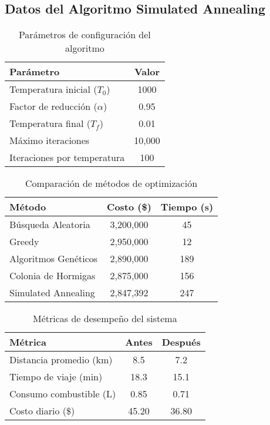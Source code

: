 \documentclass[12pt,a4paper,twocolumn]{article}
\begin{document}
\subsection{Datos del Algoritmo Simulated Annealing}

\begin{table}[h!]
\centering
\caption{Parámetros de configuración del algoritmo}
\begin{tabular}{@{}lc@{}}
\toprule
\textbf{Parámetro} & \textbf{Valor} \\
\midrule
Temperatura inicial ($T_0$) & 1000 \\
Factor de reducción ($\alpha$) & 0.95 \\
Temperatura final ($T_f$) & 0.01 \\
Máximo iteraciones & 10,000 \\
Iteraciones por temperatura & 100 \\
\bottomrule
\end{tabular}
\end{table}

\begin{table}[h!]
\centering
\caption{Comparación de métodos de optimización}
\begin{tabular}{@{}lcc@{}}
\toprule
\textbf{Método} & \textbf{Costo (\$)} & \textbf{Tiempo (s)} \\
\midrule
Búsqueda Aleatoria & 3,200,000 & 45 \\
Greedy & 2,950,000 & 12 \\
Algoritmos Genéticos & 2,890,000 & 189 \\
Colonia de Hormigas & 2,875,000 & 156 \\
Simulated Annealing & 2,847,392 & 247 \\
\bottomrule
\end{tabular}
\end{table}

\begin{table}[h!]
\centering
\caption{Métricas de desempeño del sistema}
\begin{tabular}{@{}lcc@{}}
\toprule
\textbf{Métrica} & \textbf{Antes} & \textbf{Después} \\
\midrule
Distancia promedio (km) & 8.5 & 7.2 \\
Tiempo de viaje (min) & 18.3 & 15.1 \\
Consumo combustible (L) & 0.85 & 0.71 \\
Costo diario (\$) & 45.20 & 36.80 \\
\bottomrule
\end{tabular}
\end{table}
\end{document}
